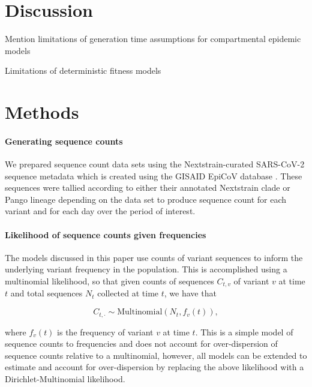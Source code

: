 \documentclass[12pt,oneside,letterpaper]{article}
\begin{document}

\section*{Discussion}

Mention limitations of generation time assumptions for compartmental epidemic models

Limitations of deterministic fitness models 


\section*{Methods}

\paragraph{Generating sequence counts}%

We prepared sequence count data sets using the Nextstrain-curated SARS-CoV-2 sequence metadata \cite{Hadfield2018} which is created using the GISAID EpiCoV database \cite{khare2021gisaid}.
These sequences were tallied according to either their annotated Nextstrain clade or Pango lineage depending on the data set to produce sequence count for each variant and for each day over the period of interest.

\cite{aksamentov2021nextclade}

\paragraph{Likelihood of sequence counts given frequencies}

The models discussed in this paper use counts of variant sequences to inform the underlying variant frequency in the population.
This is accomplished using a multinomial likelihood, so that given counts of sequences $C_{t,v}$ of variant $v$ at time $t$ and total sequences $N_{t}$ collected at time $t$, we have that

\begin{equation*}
    C_{t, \cdot} \sim \text{Multinomial}(N_{t}, f_{v}(t)),
\end{equation*}

where $f_{v}(t)$ is the frequency of variant $v$ at time $t$.
This is a simple model of sequence counts to frequencies and does not account for over-dispersion of sequence counts relative to a multinomial, however, all models can be extended to estimate and account for over-dispersion by replacing the above likelihood with a Dirichlet-Multinomial likelihood.
\end{document}
